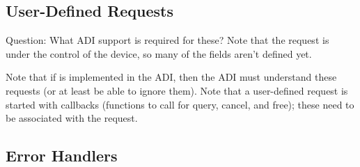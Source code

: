 \documentclass{article}
\begin{document}
\subsubsection{}

\subsection{User-Defined Requests}

Question:  What ADI support is required for these?  Note that the
request is under the control of the device, so many of the fields
aren't defined yet.

Note that if  is implemented in the ADI, then the
ADI must understand these requests (or at least be able to ignore
them).
Note that a user-defined request is started with callbacks (functions
to call for query, cancel, and free); these need to be associated with
the request.  

\subsubsection{}
\subsubsection{}

\subsection{Error Handlers}


\subsubsection{}

\subsubsection{}

\subsubsection{}

\subsubsection{}
\end{document}
